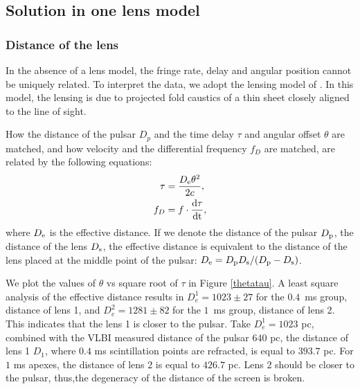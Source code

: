 \documentclass[useAMS,usenatbib]{mn2e}
\begin{document}
\subsection{Solution in one lens model}
\subsubsection{Distance of the lens}
In the absence of a lens model, the
fringe rate, delay and angular position cannot be uniquely related. To interpret the data, we adopt the lensing model of
\citep{2014MNRAS.442.3338P}.  In this model, the lensing is due to projected fold caustics of a thin sheet closely aligned to the line of sight. 

How the distance of the pulsar $D_p$ and the time delay $\tau$ and angular offset $\theta$ are matched, and how velocity and the differential frequency $f_D$ are matched, are related by the following equations:
\begin{align*}
\tau &=\frac{D_{\rm e}{\theta}^2}{2c}, \\
f_D  &=f\cdot\frac{\rm d\tau}{\rm dt},
\end{align*} 
where ${D_{\rm e}}$ is the effective distance. If we denote the distance of the pulsar $D_{\rm p}$, the distance of the lens $D_{\rm s}$, the effective distance is equivalent to the distance of the lens placed at the middle point of the pulsar: $D_{\rm e}={D_{\rm p} D_{\rm s}}/({D_{\rm p} - D_{\rm s}})$. 

We plot the values of $\theta$ vs square root of $\tau$ in Figure \ref{thetatau}. A least square analysis of the effective distance results in
$D_e^1=1023\pm 27$ for the  $0.4$\ ms group, distance of lens 1, and
$D_e^2 = 1281 \pm 82$ for the $1$\ ms group, distance of lens 2. This indicates that the lens 1 is closer to the pulsar. 
Take $D_e^1=1023$ pc, combined with the VLBI measured distance of the pulsar $640$ pc, the distance of lens 1 $D_{1}$, where $0.4$ ms scintillation points are refracted, is equal to $393.7$ pc. For $1$ ms apexes, the distance of lens 2 is equal to $426.7$ pc. Lens 2 should be closer to the pulsar, thus,the degeneracy of the distance of the screen is broken.
\end{document}
